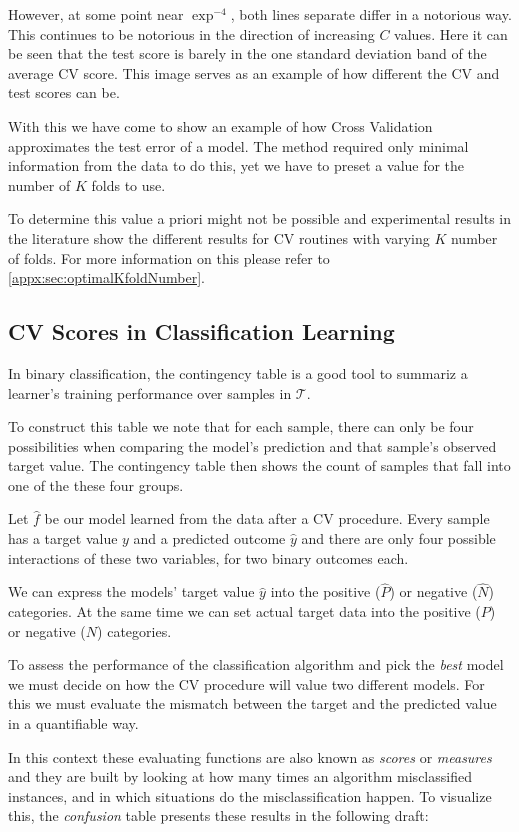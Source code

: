 However, at some point near $\exp^{-4}$, both lines separate differ in a notorious way.
This continues to be notorious in the direction of increasing $C$ values.
Here it can be seen that the test score is barely in the one standard deviation band of the average CV score.
This image serves as an example of how different the CV and test scores can be.

With this we have come to show an example of how Cross Validation approximates the test error of a model.
The method required only minimal information from the data to do this, yet we have to preset a value for the number of $K$ folds to use.

To determine this value a priori might not be possible and experimental results in the literature show the different results for CV routines with varying $K$ number of folds.
For more information on this please refer to \cref{appx:sec:optimalKfoldNumber}.


\subsection{CV Scores in Classification Learning}\label{section:scoring_functions}

In binary classification, the contingency table is a good tool to summariz a learner's training performance over samples in $\mathcal{T}$.

To construct this table we note that for each sample, there can only be four possibilities when comparing the model's prediction and that sample's observed target value.
The contingency table then shows the count of samples that fall into one of the these four groups.

Let $\hat{f}$ be our model learned from the data after a CV procedure.
Every sample has a target value $y$ and a predicted outcome $\hat{y}$ and there are only four possible interactions of these two variables, for two binary outcomes each.

We can express the models' target value $\hat{y}$ into the positive ($\hat{P}$) or negative ($\hat{N}$) categories.
At the same time we can set actual target data into the positive ($P$) or negative ($N$) categories.

To assess the performance of the classification algorithm and pick the \textit{best} model we must decide on how the CV procedure will value two different models.
For this we must evaluate the mismatch between the target and the predicted value in a quantifiable way.

In this context these evaluating functions are also known as \textit{scores} or \textit{measures} and they are built by looking at how many times an algorithm misclassified instances, and in which situations do the misclassification happen.
To visualize this, the \textit{confusion} table presents these results in the following draft:

